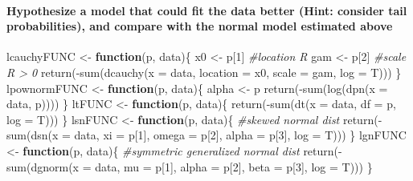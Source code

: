 \documentclass[
]{article}
\newenvironment{Shaded}{\begin{snugshade}}{\end{snugshade}}
\newcommand{\AttributeTok}[1]{\textcolor[rgb]{0.77,0.63,0.00}{#1}}
\newcommand{\CommentTok}[1]{\textcolor[rgb]{0.56,0.35,0.01}{\textit{#1}}}
\newcommand{\ControlFlowTok}[1]{\textcolor[rgb]{0.13,0.29,0.53}{\textbf{#1}}}
\newcommand{\DecValTok}[1]{\textcolor[rgb]{0.00,0.00,0.81}{#1}}
\newcommand{\FunctionTok}[1]{\textcolor[rgb]{0.00,0.00,0.00}{#1}}
\newcommand{\NormalTok}[1]{#1}
\newcommand{\OtherTok}[1]{\textcolor[rgb]{0.56,0.35,0.01}{#1}}
\newcommand{\SpecialCharTok}[1]{\textcolor[rgb]{0.00,0.00,0.00}{#1}}
\begin{document}
\hypertarget{hypothesize-a-model-that-could-fit-the-data-better-hint-consider-tail-probabilities-and-compare-with-the-normal-model-estimated-above}{%
\paragraph{Hypothesize a model that could fit the data better (Hint:
consider tail probabilities), and compare with the normal model
estimated
above}\label{hypothesize-a-model-that-could-fit-the-data-better-hint-consider-tail-probabilities-and-compare-with-the-normal-model-estimated-above}}

\begin{Shaded}
\begin{Highlighting}[]
\NormalTok{lcauchyFUNC }\OtherTok{\textless{}{-}} \ControlFlowTok{function}\NormalTok{(p, data)\{}
\NormalTok{  x0 }\OtherTok{\textless{}{-}}\NormalTok{ p[}\DecValTok{1}\NormalTok{] }\CommentTok{\#location R}
\NormalTok{  gam }\OtherTok{\textless{}{-}}\NormalTok{ p[}\DecValTok{2}\NormalTok{] }\CommentTok{\#scale R \textgreater{} 0}
  \FunctionTok{return}\NormalTok{(}\SpecialCharTok{{-}}\FunctionTok{sum}\NormalTok{(}\FunctionTok{dcauchy}\NormalTok{(}\AttributeTok{x =}\NormalTok{ data, }\AttributeTok{location =}\NormalTok{ x0, }\AttributeTok{scale =}\NormalTok{ gam, }\AttributeTok{log =}\NormalTok{ T)))}
\NormalTok{\}}
\NormalTok{lpownormFUNC }\OtherTok{\textless{}{-}} \ControlFlowTok{function}\NormalTok{(p, data)\{}
\NormalTok{  alpha }\OtherTok{\textless{}{-}}\NormalTok{ p}
  \FunctionTok{return}\NormalTok{(}\SpecialCharTok{{-}}\FunctionTok{sum}\NormalTok{(}\FunctionTok{log}\NormalTok{(}\FunctionTok{dpn}\NormalTok{(}\AttributeTok{x =}\NormalTok{ data, p))))}
\NormalTok{\}}
\NormalTok{ltFUNC }\OtherTok{\textless{}{-}} \ControlFlowTok{function}\NormalTok{(p, data)\{}
  \FunctionTok{return}\NormalTok{(}\SpecialCharTok{{-}}\FunctionTok{sum}\NormalTok{(}\FunctionTok{dt}\NormalTok{(}\AttributeTok{x =}\NormalTok{ data, }\AttributeTok{df =}\NormalTok{ p, }\AttributeTok{log =}\NormalTok{ T)))}
\NormalTok{\}}
\NormalTok{lsnFUNC }\OtherTok{\textless{}{-}} \ControlFlowTok{function}\NormalTok{(p, data)\{ }\CommentTok{\#skewed normal dist}
  \FunctionTok{return}\NormalTok{(}\SpecialCharTok{{-}}\FunctionTok{sum}\NormalTok{(}\FunctionTok{dsn}\NormalTok{(}\AttributeTok{x =}\NormalTok{ data, }\AttributeTok{xi =}\NormalTok{ p[}\DecValTok{1}\NormalTok{], }\AttributeTok{omega =}\NormalTok{ p[}\DecValTok{2}\NormalTok{], }\AttributeTok{alpha =}\NormalTok{ p[}\DecValTok{3}\NormalTok{], }\AttributeTok{log =}\NormalTok{ T)))}
\NormalTok{\}}
\NormalTok{lgnFUNC }\OtherTok{\textless{}{-}} \ControlFlowTok{function}\NormalTok{(p, data)\{ }\CommentTok{\#symmetric generalized normal dist}
  \FunctionTok{return}\NormalTok{(}\SpecialCharTok{{-}}\FunctionTok{sum}\NormalTok{(}\FunctionTok{dgnorm}\NormalTok{(}\AttributeTok{x =}\NormalTok{ data, }\AttributeTok{mu =}\NormalTok{ p[}\DecValTok{1}\NormalTok{], }\AttributeTok{alpha =}\NormalTok{ p[}\DecValTok{2}\NormalTok{], }\AttributeTok{beta =}\NormalTok{ p[}\DecValTok{3}\NormalTok{], }\AttributeTok{log =}\NormalTok{ T)))}
\NormalTok{\}}


\end{Highlighting}
\end{Shaded}
\end{document}
